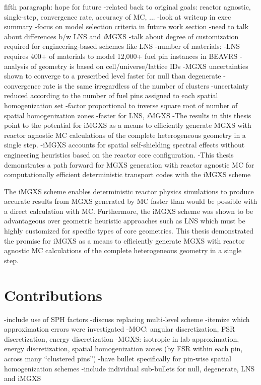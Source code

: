fifth paragraph: hope for future
-related back to original goals: reactor agnostic, single-step, convergence rate, accuracy of \ac{MC}, ...
-look at writeup in exec summary
-focus on model selection criteria in future work section
-need to talk about differences b/w \ac{LNS} and \textit{i}\ac{MGXS}
-talk about degree of customization required for engineering-based schemes like \ac{LNS}
-number of materials:
  -\ac{LNS} requires 400+ of materials to model 12,000+ fuel pin instances in \ac{BEAVRS}
    -analysis of geometry is based on cell/universe/lattice IDs
-MGXS uncertainties shown to converge to a prescribed level faster for null than degenerate
  -convergence rate is the same irregardless of the number of clusters
  -uncertainty reduced according to the number of fuel pins assigned to each spatial homogenization set
  -factor proportional to inverse square root of number of spatial homogenization zones
  -faster for \ac{LNS}, \textit{i}\ac{MGXS}
-The results in this thesis point to the potential for iMGXS as a means to efficiently generate MGXS with reactor agnostic MC calculations of the complete heterogeneous geometry in a single step.
-iMGXS accounts for spatial self-shielding spectral effects without engineering heuristics based on the reactor core configuration.
-This thesis demonstrates a path forward for MGXS generation with reactor agnostic MC for computationally efficient deterministic transport codes with the iMGXS scheme

The iMGXS scheme enables deterministic reactor physics simulations to produce accurate results from MGXS generated by MC faster than would be possible with a direct calculation with MC. Furthermore, the iMGXS scheme was shown to be advantageous over geometric heuristic approaches such as LNS which must be highly customized for specific types of core geometries. This thesis demonstrated the promise for iMGXS as a means to efficiently generate MGXS with reactor agnostic MC calculations of the complete heterogeneous geometry in a single step.

\section{Contributions}
\label{sec:chap12-contributions}

-include use of \ac{SPH} factors
-discuss replacing multi-level scheme
-itemize which approximation errors were investigated
  -MOC: angular discretization, \ac{FSR} discretization, energy discretization
  -MGXS: isotropic in lab approximation, energy discretization, spatial homogenization zones (by FSR within each pin, across many ``clustered pins'')
-have bullet specifically for pin-wise spatial homogenization schemes
 -include individual sub-bullets for null, degenerate, LNS and iMGXS

